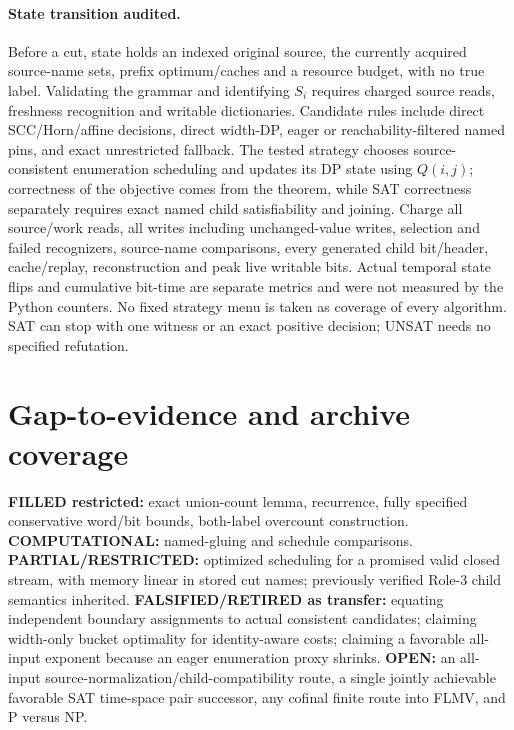 \documentclass[11pt]{article}
\begin{document}
\paragraph{State transition audited.}
Before a cut, state holds an indexed original source, the currently acquired source-name sets, prefix optimum/caches and a resource budget, with no true label. Validating the grammar and identifying \(S_i\) requires charged source reads, freshness recognition and writable dictionaries. Candidate rules include direct SCC/Horn/affine decisions, direct width-DP, eager or reachability-filtered named pins, and exact unrestricted fallback. The tested strategy chooses source-consistent enumeration scheduling and updates its DP state using \(Q(i,j)\); correctness of the objective comes from the theorem, while SAT correctness separately requires exact named child satisfiability and joining. Charge all source/work reads, all writes including unchanged-value writes, selection and failed recognizers, source-name comparisons, every generated child bit/header, cache/replay, reconstruction and peak live writable bits. Actual temporal state flips and cumulative bit-time are separate metrics and were not measured by the Python counters. No fixed strategy menu is taken as coverage of every algorithm. SAT can stop with one witness or an exact positive decision; UNSAT needs no specified refutation.

\section{Gap-to-evidence and archive coverage}
\textbf{FILLED restricted:} exact union-count lemma, recurrence, fully specified conservative word/bit bounds, both-label overcount construction. \textbf{COMPUTATIONAL:} named-gluing and schedule comparisons. \textbf{PARTIAL/RESTRICTED:} optimized scheduling for a promised valid closed stream, with memory linear in stored cut names; previously verified Role-3 child semantics inherited. \textbf{FALSIFIED/RETIRED as transfer:} equating independent boundary assignments to actual consistent candidates; claiming width-only bucket optimality for identity-aware costs; claiming a favorable all-input exponent because an eager enumeration proxy shrinks. \textbf{OPEN:} an all-input source-normalization/child-compatibility route, a single jointly achievable favorable SAT time-space pair successor, any cofinal finite route into FLMV, and P versus NP.
\end{document}
